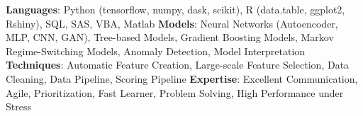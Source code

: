 

\begin{cvparagraph}
{\textbf{Languages}: Python (tensorflow, numpy, dask, scikit), R (data.table, ggplot2, Rshiny), SQL, SAS, VBA, Matlab}\newline
{\textbf{Models}: Neural Networks (Autoencoder, MLP, CNN, GAN), Tree-based Models, Gradient Boosting Models, Markov Regime-Switching Models, Anomaly Detection, Model Interpretation}\newline
{\textbf{Techniques}: Automatic Feature Creation, Large-scale Feature Selection, Data Cleaning, Data Pipeline, Scoring Pipeline}\newline
{\textbf{Expertise}: Excellent Communication, Agile, Prioritization, Fast Learner, Problem Solving, High Performance under Stress}
\end{cvparagraph}
